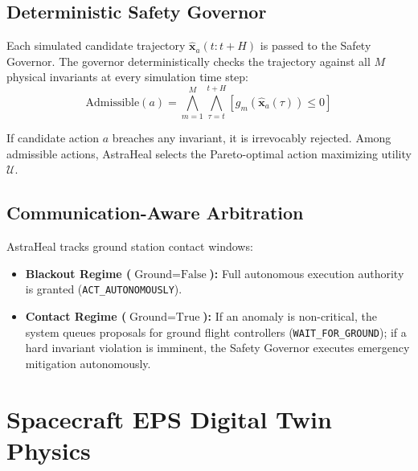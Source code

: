 \documentclass[conference]{IEEEtran}
\begin{document}
\subsection{Deterministic Safety Governor}
Each simulated candidate trajectory $\widehat{\mathbf{x}}_a(t:t+H)$ is passed to the Safety Governor. The governor deterministically checks the trajectory against all $M$ physical invariants at every simulation time step:
\begin{equation}
\text{Admissible}(a) = \bigwedge_{m=1}^M \bigwedge_{\tau=t}^{t+H} \left[ g_m(\widehat{\mathbf{x}}_a(\tau)) \le 0 \right]
\end{equation}

If candidate action $a$ breaches any invariant, it is irrevocably rejected. Among admissible actions, AstraHeal selects the Pareto-optimal action maximizing utility $\mathcal{U}$.

\subsection{Communication-Aware Arbitration}
AstraHeal tracks ground station contact windows:
\begin{itemize}
    \item \textbf{Blackout Regime ($\text{Ground} = \text{False}$):} Full autonomous execution authority is granted (\texttt{ACT\_AUTONOMOUSLY}).
    \item \textbf{Contact Regime ($\text{Ground} = \text{True}$):} If an anomaly is non-critical, the system queues proposals for ground flight controllers (\texttt{WAIT\_FOR\_GROUND}); if a hard invariant violation is imminent, the Safety Governor executes emergency mitigation autonomously.
\end{itemize}

\section{Spacecraft EPS Digital Twin Physics}
\end{document}
